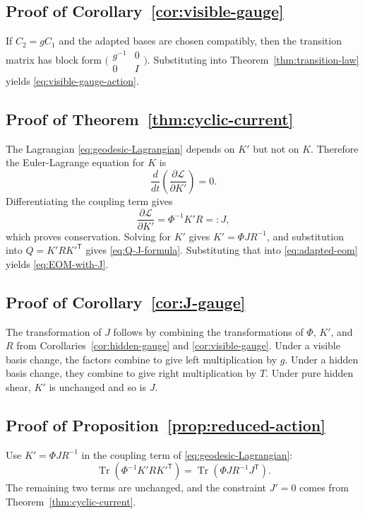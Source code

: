 \documentclass[11pt,a4paper]{article}
\numberwithin{equation}{section}
\DeclareMathOperator{\Tr}{Tr}
\theoremstyle{thmcompact}
\theoremstyle{remark}
\begin{document}
\subsection*{Proof of Corollary~\ref{cor:visible-gauge}}
If $C_2=gC_1$ and the adapted bases are chosen compatibly, then the transition matrix has block form $\bigl(\begin{smallmatrix}g^{-1}&0\\0&I\end{smallmatrix}\bigr)$. Substituting into Theorem~\ref{thm:transition-law} yields \eqref{eq:visible-gauge-action}.

\subsection*{Proof of Theorem~\ref{thm:cyclic-current}}
The Lagrangian \eqref{eq:geodesic-Lagrangian} depends on $K'$ but not on $K$. Therefore the Euler-Lagrange equation for $K$ is
\[
\frac{d}{dt}\left(\frac{\partial\mathcal L}{\partial K'}\right)=0.
\]
Differentiating the coupling term gives
\[
\frac{\partial\mathcal L}{\partial K'}=\Phi^{-1}K'R=:J,
\]
which proves conservation. Solving for $K'$ gives $K'=\Phi J R^{-1}$, and substitution into $Q=K'RK'^{\mathsf T}$ gives \eqref{eq:Q-J-formula}. Substituting that into \eqref{eq:adapted-eom} yields \eqref{eq:EOM-with-J}.

\subsection*{Proof of Corollary~\ref{cor:J-gauge}}
The transformation of $J$ follows by combining the transformations of $\Phi$, $K'$, and $R$ from Corollaries~\ref{cor:hidden-gauge} and \ref{cor:visible-gauge}. Under a visible basis change, the factors combine to give left multiplication by $g$. Under a hidden basis change, they combine to give right multiplication by $T$. Under pure hidden shear, $K'$ is unchanged and so is $J$.

\subsection*{Proof of Proposition~\ref{prop:reduced-action}}
Use $K'=\Phi J R^{-1}$ in the coupling term of \eqref{eq:geodesic-Lagrangian}:
\[
\Tr(\Phi^{-1}K'RK'^{\mathsf T}) = \Tr(\Phi J R^{-1}J^{\mathsf T}).
\]
The remaining two terms are unchanged, and the constraint $J'=0$ comes from Theorem~\ref{thm:cyclic-current}.
\end{document}
